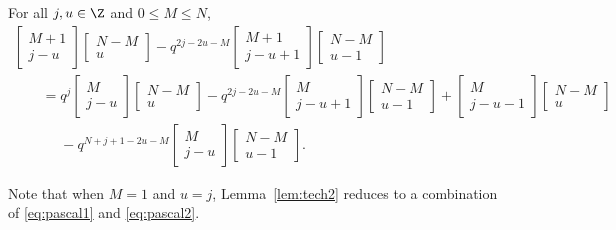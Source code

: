 \begin{Lemma}
\label{lem:tech2}
For all $j,u \in \Z$ and $0\leq M\leq N$,
\begin{gather*}
\begin{bmatrix}
M+1\\
j-u
\end{bmatrix} \begin{bmatrix}
N-M\\
u
\end{bmatrix}-q^{2j-2u-M}\begin{bmatrix}
M+1\\
j-u+1
\end{bmatrix} \begin{bmatrix}
N-M\\
u-1
\end{bmatrix}\\
\qquad
=q^j \begin{bmatrix}
M\\
j-u
\end{bmatrix} \begin{bmatrix}
N-M\\
u
\end{bmatrix}
- q^{2j-2u-M}\begin{bmatrix}
M\\
j-u+1
\end{bmatrix} \begin{bmatrix}
N-M\\
u-1
\end{bmatrix}+\begin{bmatrix}
M\\
j-u-1
\end{bmatrix} \begin{bmatrix}
N-M\\
u
\end{bmatrix}\\
\phantom{\qquad=}{}- q^{N+j+1-2u-M} \begin{bmatrix}
M\\
j-u
\end{bmatrix} \begin{bmatrix}
N-M\\
u-1
\end{bmatrix}.
\end{gather*}
\end{Lemma}

Note that when $M=1$ and $u=j$, Lemma~\ref{lem:tech2} reduces to a combination of \eqref{eq:pascal1} and \eqref{eq:pascal2}.


